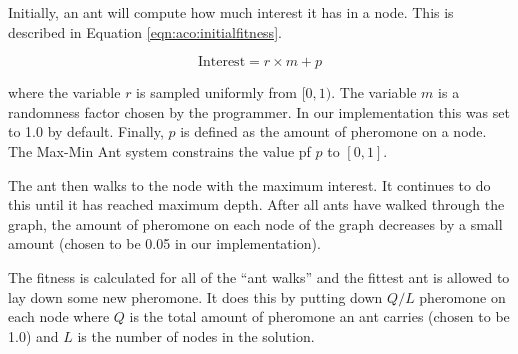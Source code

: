 Initially, an ant will compute how much interest it has in a node. This is described in Equation \ref{eqn:aco:initialfitness}.

\begin{equation}
\label{eqn:aco:initialfitness}
\text{Interest} = r \times m + p
\end{equation}

\noindent where the variable $r$ is sampled uniformly from $[0, 1)$. The variable $m$ is a randomness factor chosen by the programmer. In our implementation this was set to 1.0 by default. Finally, $p$ is defined as the amount of pheromone on a node. The Max-Min Ant system constrains the value pf $p$ to $[0, 1]$. 

The ant then walks to the node with the maximum interest. It continues to do this until it has reached maximum depth. After all ants have walked through the graph, the amount of pheromone on each node of the graph decreases by a small amount (chosen to be 0.05 in our implementation).

The fitness is calculated for all of the ``ant walks'' and the fittest ant is allowed to lay down some new pheromone. It does this by putting down $Q/L$ pheromone on each node where $Q$ is the total amount of pheromone an ant carries (chosen to be 1.0) and $L$ is the number of nodes in the solution.
